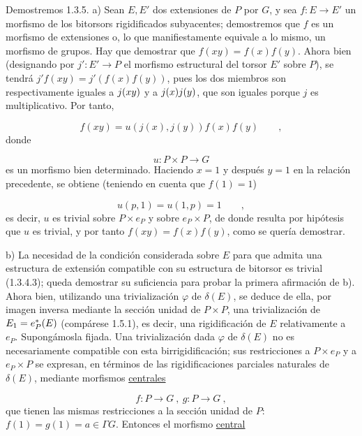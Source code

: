 Demostremos 1.3.5.  a)  Sean $E,E'$ dos extensiones de $P$ por $G$, y
sea $f : E \longrightarrow E'$ un morfismo de los bitorsors
rigidificados subyacentes; demostremos que $f$ es un morfismo de
extensiones o, lo que manifiestamente equivale a lo mismo, un morfismo
de grupos. Hay que demostrar que $f(xy) = f(x)f(y)$. Ahora bien
(designando por $j' : E' \longrightarrow P$ el morfismo estructural del
torsor $E'$ sobre $P$), se tendrá
$j'f(xy) = j'(f(x)f(y))$, pues los dos miembros son respectivamente
iguales a $\sisi{j(f(xy))}{j(xy)}$ y a $\sisi{j(f(x)f(y))}{j(x)j(y)}$, que son iguales porque $j$ es
multiplicativo. Por tanto,

\begin{equation*}
f(xy) = u(j(x),j(y))f(x)f(y) \qquad ,
\end{equation*}
donde

\begin{equation*}
u : P \times P \longrightarrow G
\end{equation*}
es un morfismo bien determinado. Haciendo $x=1$ y después $y=1$ en la
relación precedente, se obtiene (teniendo en cuenta que $f(1)=1$)

\begin{equation*}
u(p,1) = u(1,p) = 1 \qquad ,
\end{equation*}
es decir, $u$ es trivial sobre $P \times e_P$ y sobre
$e_P \times P$, de donde resulta por hipótesis que $u$ es trivial, y
por tanto $f(xy) = f(x)f(y)$, como se quería demostrar.

b)  La necesidad de la condición considerada sobre $E$ para que
admita una estructura de extensión compatible con su estructura de
bitorsor es trivial (1.3.4.3); queda demostrar su suficiencia para
probar la primera afirmación de b). Ahora bien, utilizando una
trivialización $\varphi$
de $\delta(E)$, se deduce de ella, por imagen inversa mediante la
sección unidad de $P \times P$, una trivialización de
$E_1 = \sisi{e_P(E)}{e_P^*(E)}$ (compárese 1.5.1), es decir, una
rigidificación de $E$
relativamente a $e_P$. Supongámosla fijada. Una trivialización dada
$\varphi$ de $\delta(E)$ no es necesariamente compatible con esta
birrigidificación; sus restricciones a $P \times e_P$ y a
$e_P \times P$ se expresan, en términos de las rigidificaciones
parciales naturales de $\delta(E)$, mediante morfismos
\underline{centrales}

\begin{equation*}
f : P \longrightarrow G \ , \ g : P \longrightarrow G \ ,
\end{equation*}
que tienen las mismas restricciones a la sección unidad de $P$:
$f(1) = g(1) = a \in \Gamma G$. Entonces el morfismo
\underline{central}

